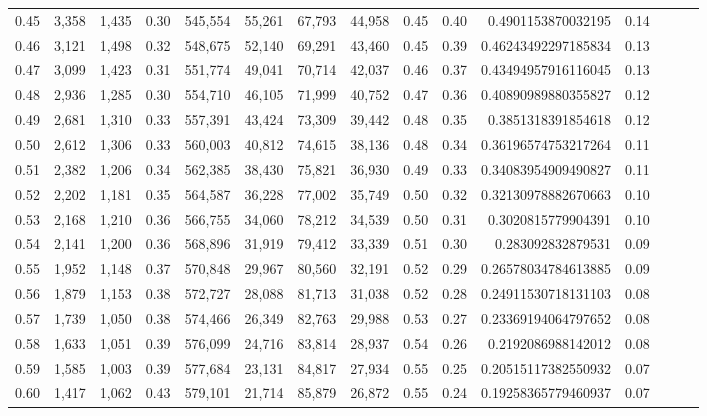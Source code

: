 \begin{tabular}{rrrrrrrrrrrrrrr}
0.45 &   3,358 &  1,435 &  0.30 &  545,554 &   55,261 &   67,793 &   44,958 &  0.45 &  0.40 &    0.4901153870032195 &      0.14 \\
0.46 &   3,121 &  1,498 &  0.32 &  548,675 &   52,140 &   69,291 &   43,460 &  0.45 &  0.39 &   0.46243492297185834 &      0.13 \\
0.47 &   3,099 &  1,423 &  0.31 &  551,774 &   49,041 &   70,714 &   42,037 &  0.46 &  0.37 &   0.43494957916116045 &      0.13 \\
0.48 &   2,936 &  1,285 &  0.30 &  554,710 &   46,105 &   71,999 &   40,752 &  0.47 &  0.36 &   0.40890989880355827 &      0.12 \\
0.49 &   2,681 &  1,310 &  0.33 &  557,391 &   43,424 &   73,309 &   39,442 &  0.48 &  0.35 &    0.3851318391854618 &      0.12 \\
0.50 &   2,612 &  1,306 &  0.33 &  560,003 &   40,812 &   74,615 &   38,136 &  0.48 &  0.34 &   0.36196574753217264 &      0.11 \\
0.51 &   2,382 &  1,206 &  0.34 &  562,385 &   38,430 &   75,821 &   36,930 &  0.49 &  0.33 &   0.34083954909490827 &      0.11 \\
0.52 &   2,202 &  1,181 &  0.35 &  564,587 &   36,228 &   77,002 &   35,749 &  0.50 &  0.32 &   0.32130978882670663 &      0.10 \\
0.53 &   2,168 &  1,210 &  0.36 &  566,755 &   34,060 &   78,212 &   34,539 &  0.50 &  0.31 &    0.3020815779904391 &      0.10 \\
0.54 &   2,141 &  1,200 &  0.36 &  568,896 &   31,919 &   79,412 &   33,339 &  0.51 &  0.30 &     0.283092832879531 &      0.09 \\
0.55 &   1,952 &  1,148 &  0.37 &  570,848 &   29,967 &   80,560 &   32,191 &  0.52 &  0.29 &   0.26578034784613885 &      0.09 \\
0.56 &   1,879 &  1,153 &  0.38 &  572,727 &   28,088 &   81,713 &   31,038 &  0.52 &  0.28 &   0.24911530718131103 &      0.08 \\
0.57 &   1,739 &  1,050 &  0.38 &  574,466 &   26,349 &   82,763 &   29,988 &  0.53 &  0.27 &   0.23369194064797652 &      0.08 \\
0.58 &   1,633 &  1,051 &  0.39 &  576,099 &   24,716 &   83,814 &   28,937 &  0.54 &  0.26 &    0.2192086988142012 &      0.08 \\
0.59 &   1,585 &  1,003 &  0.39 &  577,684 &   23,131 &   84,817 &   27,934 &  0.55 &  0.25 &   0.20515117382550932 &      0.07 \\
0.60 &   1,417 &  1,062 &  0.43 &  579,101 &   21,714 &   85,879 &   26,872 &  0.55 &  0.24 &   0.19258365779460937 &      0.07 \\

\end{tabular}
